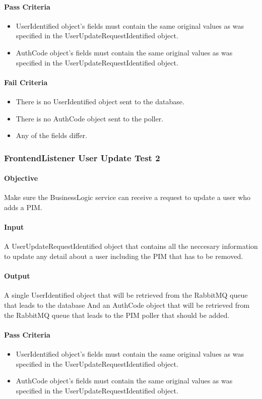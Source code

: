 \documentclass[hidelinks,english]{article}
\begin{document}
				\paragraph{Pass Criteria}
				\begin{itemize}
					\item UserIdentified object's fields must contain the same original values as was specified in the UserUpdateRequestIdentified object.
					\item AuthCode object's fields must contain the same original values as was specified in the UserUpdateRequestIdentified object.
				\end{itemize}
				\paragraph{Fail Criteria}
				\begin{itemize}
					\item There is no UserIdentified object sent to the database.
					\item There is no AuthCode object sent to the poller.
					\item Any of the fields differ.
				\end{itemize}
			
			\subsubsection{FrontendListener User Update Test 2}\label{businessfrontendlistenerupdatetest2}
				\paragraph{Objective} Make sure the BusinessLogic service can receive a request to update a user who adds a PIM.
				\paragraph{Input} A UserUpdateRequestIdentified object that contains all the neccesary information to update any detail about a user including the PIM that has to be removed.
				\paragraph{Output} A single UserIdentified object that will be retrieved from the RabbitMQ queue that leads to the database And an AuthCode object that  will be retrieved from the RabbitMQ queue that leads to the PIM poller that should be added.
				\paragraph{Pass Criteria}
				\begin{itemize}
					\item UserIdentified object's fields must contain the same original values as was specified in the UserUpdateRequestIdentified object.
					\item AuthCode object's fields must contain the same original values as was specified in the UserUpdateRequestIdentified object.
				\end{itemize}
\end{document}
